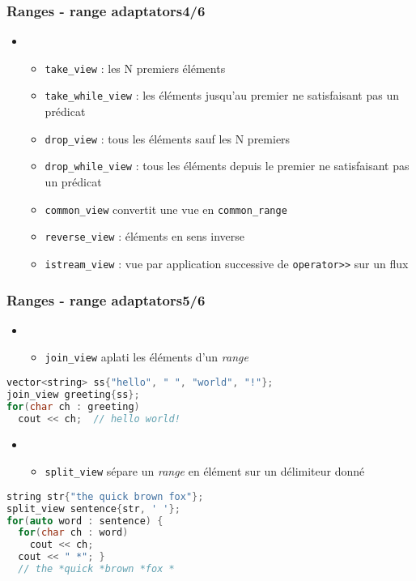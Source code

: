 \documentclass[C++.tex]{subfiles}
\begin{document}
\begin{frame}[fragile]
	\frametitle{Ranges - range adaptators\titlehfill{}4/6}
	\begin{itemize}
		\item  [] \begin{itemize}
			\item \lstinline|take_view| : les N premiers éléments
			\item \lstinline|take_while_view| : les éléments jusqu'au premier ne satisfaisant pas un prédicat
			\item \lstinline|drop_view| : tous les éléments sauf les N premiers
			\item \lstinline|drop_while_view| : tous les éléments depuis le premier ne satisfaisant pas un prédicat
			\item \lstinline|common_view| convertit une vue en \lstinline|common_range|
			\item \lstinline|reverse_view| : éléments en sens inverse
			\item \lstinline|istream_view| : vue par application successive de \lstinline|operator>>| sur un flux
		\end{itemize}
	\end{itemize}
\end{frame}

\begin{frame}[fragile]
	\frametitle{Ranges - range adaptators\titlehfill{}5/6}
	\begin{itemize}
		\item  [] \begin{itemize}
			\item \lstinline|join_view| \og aplati\fg{} les éléments d'un \textit{range}
		\end{itemize}
	\end{itemize}

	\begin{lstlisting}[language=C++]
vector<string> ss{"hello", " ", "world", "!"};
join_view greeting{ss};
for(char ch : greeting)
  cout << ch;  // hello world!\end{lstlisting}

	\begin{itemize}
		\item  [] \begin{itemize}
			\item \lstinline|split_view| sépare un \textit{range} en élément sur un délimiteur donné
		\end{itemize}
	\end{itemize}

	\begin{lstlisting}[language=C++]
string str{"the quick brown fox"};
split_view sentence{str, ' '};
for(auto word : sentence) {
  for(char ch : word)
    cout << ch;
  cout << " *"; }
  // the *quick *brown *fox *\end{lstlisting}
\end{frame}
\end{document}
